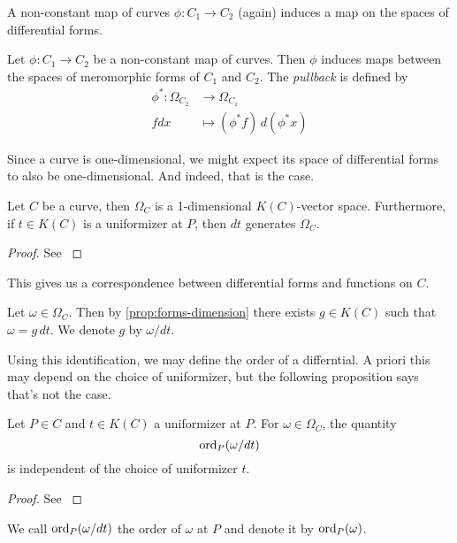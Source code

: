 A non-constant map of curves $\phi:C_1 \to C_2$ (again) induces a map
on the spaces of differential forms.

\begin{definition}
	Let $\phi: C_1 \to C_2$ be a non-constant map of curves. Then $\phi$ induces
	maps between the spaces of meromorphic forms of $C_1$ and $C_2$.
	The \emph{pullback} is defined by
	\begin{align*}
		\phi^*: \Omega_{C_2} &\to \Omega_{C_1}\\
		fdx &\mapsto (\phi^* f)\,d(\phi^* x)
	\end{align*}
\end{definition}

Since a curve is one-dimensional, we might expect its space of differential
forms to also be one-dimensional. And indeed, that is the case.

\begin{proposition}
	\label{prop:forms-dimension}
	Let $C$ be a curve, then $\Omega_C$ is a 1-dimensional $K(C)$-vector space.
	Furthermore, if $t \in K(C)$ is a uniformizer at $P$,
	then $dt$ generates $\Omega_C$.
\end{proposition}
\begin{proof}
	See \cite[II.1.4, II.4.2]{silverman}
\end{proof}

This gives us a correspondence between differential forms and functions
on $C$.

\begin{notation}
	Let $\omega \in \Omega_C$. Then by \ref{prop:forms-dimension} there exists
	$g \in K(C)$ such that $\omega = g\,dt$. We denote $g$ by $\omega/dt$.
\end{notation}

Using this identification, we may define the order of a differntial.
A priori this may depend on the choice of uniformizer, but the following
proposition says that's not the case.
\begin{proposition}
	Let $P \in C$ and $t \in K(C)$ a uniformizer at $P$. For $\omega \in
	\Omega_C$,
	the quantity
	\begin{equation*}
		\operatorname{ord}_P(\omega/dt)
	\end{equation*}
	is independent of the choice of uniformizer $t$.
\end{proposition}
\begin{proof}
	See \cite[II.4.3(c)]{silverman}
\end{proof}

\begin{definition}
	We call $\operatorname{ord}_P(\omega/dt)$ the order of $\omega$ at $P$ and denote it by
	$\operatorname{ord}_P(\omega)$.
\end{definition}

